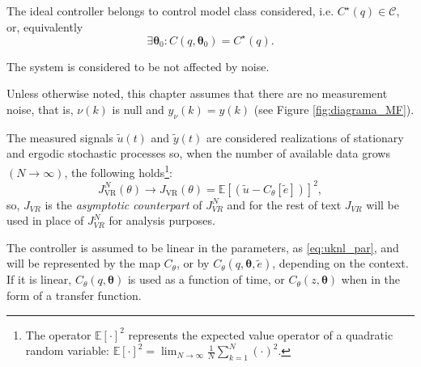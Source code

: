 \begin{assum}\label{ass:machedControl} %
   The ideal controller belongs to control model class considered, i.e. $C^\star(q) \in \mathscr{C}$, or, equivalently
   \begin{equation}
      \exists \bm{\theta}_0 : C(q,\bm{\theta}_0)=C^\star(q)
      \label{eq:assumpMatched}.
   \end{equation}
\end{assum}

\begin{assum}
   \label{ass:noiseFree} 
   The system is considered to be not affected by noise.
\end{assum}
Unless otherwise noted, this chapter assumes that there are no measurement noise, that is, $\nu(k)$ is null and $y_{\nu}(k) = y(k)$ (see Figure \ref{fig:diagrama_MF}).

\begin{assum} \label{ass:asympCount}
   The measured signals $\tilde{u}(t)$ and $\tilde{y}(t)$ are considered realizations of stationary and ergodic stochastic processes so, when the number of available data grows $(N \to \infty)$, the following holds\footnote{The operator $\mathbb{E}[\cdot]^{2}$ represents the expected value operator of a quadratic random variable: $\mathbb{E}[\cdot]^{2} = \lim_{N\to \infty} \frac{1}{N}\sum_{k=1}^{N} \left( \cdot \right)^{2}$.}:
   $$ J_{\mathrm{VR}}^{N}(\theta) \rightarrow J_{\mathrm{VR}}(\theta)=\mathbb{E}\left[ \left(\tilde{u}-C_\theta[\tilde{e} ]\right)\right]^{2}, $$
   so,  $J_{VR}$ is the \textit{asymptotic counterpart} of $J_{VR}^N$ and for the rest of text $J_{VR}$ will be used in place of $J_{VR}^N$ for analysis purposes.
\end{assum}

\begin{assum} \label{ass:LPC}
   The controller is assumed to be linear in the parameters, as \eqref{eq:uknl_par}, and will be represented by the map $C_{\theta}$, or by $C_\theta(q, \bm{\theta}, \tilde{e} )$, depending on the context. If it is linear, $C_\theta(q,\bm{\theta})$ is used as a function of time, or $C_\theta(z,\bm{\theta})$ when in the form of a transfer function.
\end{assum}

